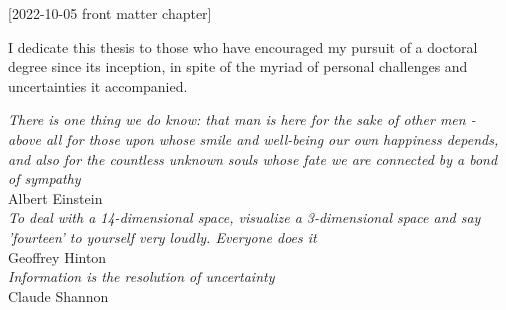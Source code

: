 [2022-10-05 front matter chapter]
%
%
%
%
%
%

%
%
%
\begin{statement}
\end{statement}

\begin{dedication}
I dedicate this thesis to those who have encouraged my pursuit of a doctoral degree since its inception, in spite of the myriad of personal challenges and uncertainties it accompanied.  

\vspace{1in}
\textit{There is one thing we do know: that man is here for the sake of other men - above all for those upon whose smile and well-being our own happiness depends, and also for the countless unknown souls whose fate we are connected by a bond of sympathy}\\
Albert Einstein\\
\vspace{1in}
\textit{To deal with a 14-dimensional space, visualize a 3-dimensional space and say 'fourteen' to yourself very loudly. Everyone does it}\\ Geoffrey Hinton \\
\vspace{1in}
\textit{Information is the resolution of uncertainty} \\Claude Shannon
\vspace{1in}



\end{dedication}

